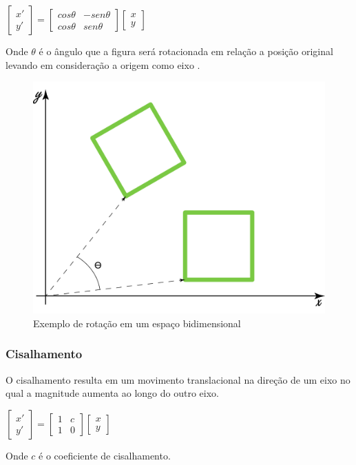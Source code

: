 \documentclass[9pt, a4paper, nofonttune, journal]{IEEEtran}
\begin{document}
\begin{center}
$\begin{bmatrix}x'\\
y'
\end{bmatrix}=\begin{bmatrix}cos\theta & -sen\theta\\
cos\theta & sen\theta
\end{bmatrix}\begin{bmatrix}x\\
y
\end{bmatrix}$\end{center}
Onde $\theta$ é o ângulo que a figura será rotacionada em relação a posição original levando em consideração a origem como eixo \cite{CGPPBook1}.

\begin{figure}[H] 
\begin{center}
\includegraphics[scale=0.25]{figuras/rotation1}
\caption{Exemplo de rotação em um espaço bidimensional}
\end{center}
\end{figure}

\subsubsection{Cisalhamento}
O cisalhamento resulta em um movimento translacional na direção de um eixo no qual a magnitude aumenta ao longo do outro eixo.

\begin{center}
$\begin{bmatrix}x'\\
y'
\end{bmatrix}=\begin{bmatrix}1 & c\\
1 & 0
\end{bmatrix}\begin{bmatrix}x\\
y
\end{bmatrix}$\end{center}
Onde $c$ é o coeficiente de cisalhamento.\cite{CGPPBook1}
\end{document}
